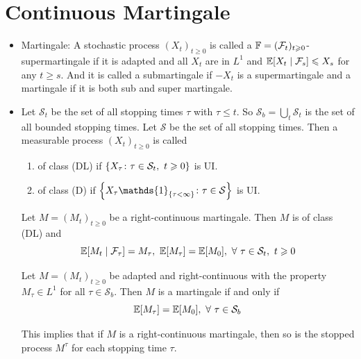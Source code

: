 \documentclass[a4paper,12pt]{article}
\begin{document}
\section{Continuous Martingale}
\begin{itemize}
  \item Martingale: A stochastic process $(X_t)_{t\geqslant 0}$ is called  a $\mathbb{F} =(\mathcal{F}_t)_{t\geqslant 0}$-supermartingale if it is adapted and all $X_t$ are in $L^1$ and $\mathbb{E}[X_t \mid \mathcal{F}_s] \leqslant X_s$ for any $t \geqslant s$. And it is called a submartingale if $-X_t$ is a supermartingale and a martingale if it is both sub and super martingale.

  \item Let $\mathcal{S}_t$ be the set of all stopping times $\tau$ with $\tau \leqslant t$. So $\mathcal{S}_b = \bigcup_t\mathcal{S}_t$ is the set of all bounded stopping times. Let $\mathcal{S}$ be the set of all stopping times. Then a measurable process $(X_t)_{t\geqslant 0}$ is called
  \begin{enumerate}[label=(\arabic*)]
    \item of class (DL) if $\left\{X_{\tau}\colon \tau \in \mathcal{S}_t,~t\geqslant 0\right\}$ is UI.
    \item of class (D) if $\bb{X_{\tau}\mathds{1}_{\bb{\tau < \infty}}\colon \tau \in \mathcal{S}}$ is UI.
  \end{enumerate}

  \begin{thm}
    Let $M = (M_t)_{t\geqslant 0}$ be a right-continuous martingale. Then $M$ is of class (DL) and
    \begin{equation*}
      \mathbb{E}[M_t \mid \mathcal{F}_{\tau}] = M_{\tau},~\mathbb{E}[M_{\tau}] = \mathbb{E}[M_0],~\forall~\tau \in \mathcal{S}_t,~t\geqslant 0
    \end{equation*}
  \end{thm}

  \begin{prop}
    Let $M = (M_t)_{t\geqslant 0}$ be adapted and right-continuous with the property $M_{\tau} \in L^1$ for all $\tau \in \mathcal{S}_b$. Then $M$ is a martingale if and only if
    \begin{equation*}
      \mathbb{E}[M_{\tau}] = \mathbb{E}[M_0],~\forall~\tau \in \mathcal{S}_b
    \end{equation*}
  \end{prop}
  This implies that if $M$ is a right-continuous martingale, then so is the stopped process $M^{\tau}$ for each stopping time $\tau$.


\end{itemize}
\end{document}
